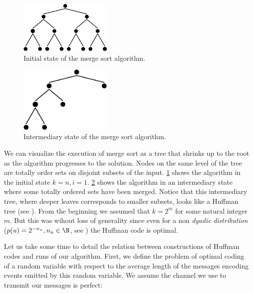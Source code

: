 \begin{figure}
	\centering
	\includegraphics[width=0.4\textwidth]{fig/merging/huffman-1-trim}
	\caption{Initial state of the merge sort algorithm.}
	\label{tree:merging:fig/huffman-1}
\end{figure}

\begin{figure}
	\centering
	\includegraphics[width=0.4\textwidth, bb= 0mm 0mm 131mm 74mm]{fig/merging/huffman-3-trim}
	\caption{Intermediary state of the merge sort algorithm.}
	\label{tree:merging:fig/huffman-3}
\end{figure}

We can visualize the execution of merge sort as a tree that shrinks up to the
root as the algorithm progresses to the solution. Nodes on the same level of
the tree are totally order sets on disjoint subsets of the input.
\ref{tree:merging:fig/huffman-1} shows the algorithm in the initial state $k =
n, i = 1$. \ref{tree:merging:fig/huffman-3} shows the algorithm in an
intermediary state where some totally ordered sets have been merged. Notice
that this intermediary tree, where deeper leaves corresponds to smaller
subsets, looks like a Huffman tree (see \cite{huffman1952method}). From the
beginning we assumed that $k = 2^m$ for some natural integer $m$. But this was
wihout loss of generality since even for a non \emph{dyadic distribution}
($p(u) = 2^{-n_u}, n_u \in \N$, see \cite{cover2012elements}) the Huffman code
is optimal.

Let us take some time to detail the relation between constructions of Huffman
codes and runs of our algorithm. First, we define the problem of optimal
coding of a random variable with respect to the average length of the messages
encoding events emitted by this random variable. We assume the channel we
use to transmit our messages is perfect:


